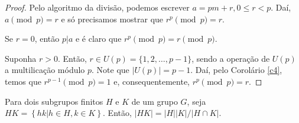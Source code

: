 	\begin{proof}
		Pelo algoritmo da divisão, podemos escrever $a = pm + r, 0\leq r < p$. Daí, $a\pmod p = r$ e só precisamos mostrar que $r^p\pmod p = r$.
		\par\vspace{0.3cm} Se $r = 0$, então $p|a$ e é claro que $r^p\pmod p = r\pmod p$.
		\par\vspace{0.3cm} Suponha $r>0$. Então, $r\in U(p) = \{1, 2, \dots, p-1\}$, sendo a operação de $U(p)$ a multilicação módulo $p$. Note que $|U(p)| = p-1$. Daí, pelo Corolário \eqref{c4}, temos que $r^{p-1}\pmod p = 1$ e, consequentemente, $r^p\pmod p = r$. 
	\end{proof}
	
	\begin{theorem}
		\label{ordem de HK}
		Para dois subgrupos finitos $H$ e $K$ de um grupo $G$, seja $HK = \left\{ hk| h\in H, k\in K \right\}$. Então, $|HK| = |H||K|/|H\cap K|$.
	\end{theorem}
	
